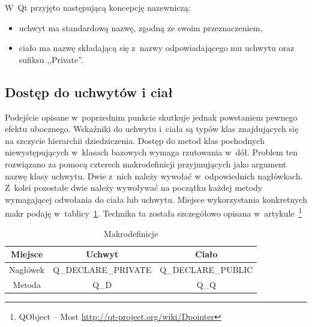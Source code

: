 W~Qt przyjęto następującą koncepcję nazewniczą:
\begin{itemize}
\item{uchwyt ma standardową nazwę, zgodną ze swoim przeznaczeniem,}
\item{ciało ma nazwę składającą się z~nazwy odpowiadającego mu uchwytu oraz sufiksu ,,Private''.}
\end{itemize}


\subsection{Dostęp do uchwytów i ciał}
Podejście opisane w~poprzednim punkcie skutkuje jednak powstaniem pewnego efektu ubocznego.
Wskaźniki do uchwytu i~ciała są typów klas znajdujących się na szczycie hierarchii dziedziczenia. Dostęp do metod klas pochodnych niewystępujących w~klasach bazowych wymaga rzutowania w~dół. 
Problem ten rozwiązano za pomocą czterech makrodefinicji przyjmujących jako argument nazwę klasy uchwytu. Dwie z~nich należy wywołać w~odpowiednich nagłówkach. Z~kolei pozostałe dwie należy wywoływać na początku każdej metody wymagającej odwołania do ciała lub uchwytu. Miejsce wykorzystania konkretnych makr podaję w~tablicy~\ref{tab:makra}. Technika ta została szczegółowo opisana w~artykule~\footnote{QObject -- Most \url{http://qt-project.org/wiki/Dpointer}}

\begin{table}[h]\footnotesize
\centering
\caption{Makrodefinicje}
\label{tab:makra}
\begin{tabular}{|c|c|c|}
\hline
Miejsce & Uchwyt & Ciało\\
\hline
Nagłówek & Q\_DECLARE\_PRIVATE & Q\_DECLARE\_PUBLIC\\
\hline
Metoda & Q\_D & Q\_Q\\
\hline
\end{tabular}
\end{table}
